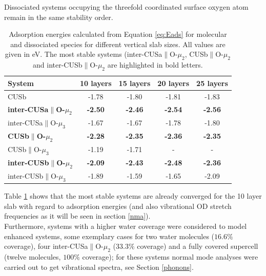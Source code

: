 \documentclass[11pt,DIV=13,BCOR=5mm,a4paper,headinclude]{scrbook}
\begin{document}
Dissociated systems occupying the threefold coordinated surface oxygen atom remain in the same stability order.
\begin{table}[!ht]
  \centering
  \caption{Adsorption energies calculated from Equation \ref{eq:Eads} for molecular and dissociated species for different vertical slab sizes.
All values are given in eV.
The most stable systems (inter-CUSa$\parallel$O-$\mu_2$, CUSb$\parallel$O-$\mu_2$ and inter-CUSb$\parallel$O-$\mu_2$ are highlighted in bold letters.}
 \begin{tabular}{l|cccc}
 \toprule
 System                     & 10 layers& 15 layers& 20 layers&  25 layers \\\midrule
CUSb                                    &-1.78 &-1.80     &-1.81     &-1.83      \\\hline
\textbf{inter-CUSa$\parallel$O-$\mu_2$}    &\textbf{-2.50} &\textbf{-2.46} &\textbf{-2.54} &\textbf{-2.56}  \\
inter-CUSa$\parallel$O-$\mu_3$          &-1.67 &-1.67 &-1.78 &-1.80 \\
\textbf{CUSb$\parallel$O-$\mu_2$}          &\textbf{-2.28} &\textbf{-2.35} &\textbf{-2.36} &\textbf{-2.35} \\
CUSb$\parallel$O-$\mu_3$                &-1.19 &-1.71 &-     &-      \\
\textbf{inter-CUSb$\parallel$O-$\mu_2$}    &\textbf{-2.09} &\textbf{-2.43} &\textbf{-2.48} &\textbf{-2.36}  \\
inter-CUSb$\parallel$O-$\mu_3$          &-1.89 &-1.59 &-1.65 &-2.09 \\\bottomrule
\end{tabular}
\label{tab:eads_layers}
\end{table}
Table \ref{tab:eads_layers} shows that the most stable systems are already converged for the 10 layer slab with regard to adsorption energies (and also vibrational OD stretch frequencies as it will be seen in section \ref{nma}).
\\
Furthermore, systems with a higher water coverage were considered to model enhanced systems, some exemplary cases for two water molecules ($16.6\%$ coverage), four inter-CUSa$\parallel$O-$\mu_2$ ($33.3\%$ coverage) and a fully covered supercell (twelve molecules, $100\%$ coverage); for these systems normal mode analyses were carried out to get vibrational spectra, see Section \ref{phonons}.
\end{document}
